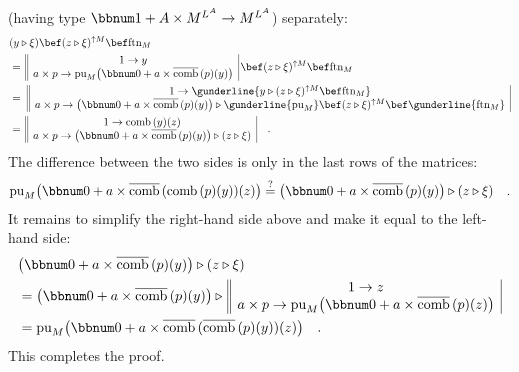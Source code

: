 (having type $\bbnum 1+A\times M^{L^{A}}\rightarrow M^{L^{A}}$) separately:
\begin{align*}
 & (y\triangleright\xi)\bef(z\triangleright\xi)^{\uparrow M}\bef\text{ftn}_{M}\\
 & =\,\begin{array}{||c|}
1\rightarrow y\\
a\times p\rightarrow\text{pu}_{M}\big(\bbnum 0+a\times\overline{\text{comb}}\,(p)(y)\big)
\end{array}\,\bef(z\triangleright\xi)^{\uparrow M}\bef\text{ftn}_{M}\\
 & =\,\,\begin{array}{||c|}
1\rightarrow\gunderline{y\triangleright(z\triangleright\xi)^{\uparrow M}\bef\text{ftn}_{M}}\\
a\times p\rightarrow\big(\bbnum 0+a\times\overline{\text{comb}}\,(p)(y)\big)\triangleright\gunderline{\text{pu}_{M}}\bef(z\triangleright\xi)^{\uparrow M}\bef\gunderline{\text{ftn}_{M}}
\end{array}\\
 & =\,\begin{array}{||c|}
1\rightarrow\text{comb}\,(y)(z)\\
a\times p\rightarrow\big(\bbnum 0+a\times\overline{\text{comb}}\,(p)(y)\big)\triangleright(z\triangleright\xi)
\end{array}\quad.
\end{align*}
The difference between the two sides is only in the last rows of the
matrices:
\[
\text{pu}_{M}\big(\bbnum 0+a\times\overline{\text{comb}}\,(\text{comb}\,(p)(y))(z)\big)\overset{?}{=}\big(\bbnum 0+a\times\overline{\text{comb}}\,(p)(y)\big)\triangleright(z\triangleright\xi)\quad.
\]
It remains to simplify the right-hand side above and make it equal
to the left-hand side:
\begin{align*}
 & \big(\bbnum 0+a\times\overline{\text{comb}}\,(p)(y)\big)\triangleright(z\triangleright\xi)\\
 & =\big(\bbnum 0+a\times\overline{\text{comb}}\,(p)(y)\big)\triangleright\,\begin{array}{||c|}
1\rightarrow z\\
a\times p\rightarrow\text{pu}_{M}\big(\bbnum 0+a\times\overline{\text{comb}}\,(p)(z)\big)
\end{array}\\
 & =\text{pu}_{M}\big(\bbnum 0+a\times\overline{\text{comb}}\,(\overline{\text{comb}}\,(p)(y))(z)\big)\quad.
\end{align*}
This completes the proof.


